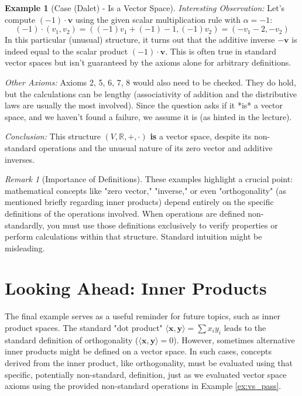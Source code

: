 \documentclass[11pt]{article}
\theoremstyle{definition}
\newtheorem{example}[theorem]{Example}
\theoremstyle{remark}
\newtheorem{remark}[theorem]{Remark}
\newcommand{\field}[1]{\mathbb{#1}} %
\newcommand{\R}{\field{R}}
\newcommand{\veca}[1]{\mathbf{#1}} %
\begin{document}
\begin{example}[Case (Dalet) - Is a Vector Space]
\textit{Interesting Observation:} Let's compute $(-1) \cdot \veca{v}$ using the given scalar multiplication rule with $\alpha = -1$:
\[ (-1) \cdot (v_1, v_2) = ((-1)v_1 + (-1) - 1, (-1)v_2) = (-v_1 - 2, -v_2) \]
In this particular (unusual) structure, it turns out that the additive inverse $-\veca{v}$ is indeed equal to the scalar product $(-1) \cdot \veca{v}$. This is often true in standard vector spaces but isn't guaranteed by the axioms alone for arbitrary definitions.

\textit{Other Axioms:} Axioms 2, 5, 6, 7, 8 would also need to be checked. They do hold, but the calculations can be lengthy (associativity of addition and the distributive laws are usually the most involved). Since the question asks if it *is* a vector space, and we haven't found a failure, we assume it is (as hinted in the lecture).

\textit{Conclusion:} This structure $(V, \R, +, \cdot)$ \textbf{is} a vector space, despite its non-standard operations and the unusual nature of its zero vector and additive inverses.
\end{example}

\begin{remark}[Importance of Definitions]
These examples highlight a crucial point: mathematical concepts like "zero vector," "inverse," or even "orthogonality" (as mentioned briefly regarding inner products) depend entirely on the specific definitions of the operations involved. When operations are defined non-standardly, you must use those definitions exclusively to verify properties or perform calculations within that structure. Standard intuition might be misleading.
\end{remark}

\section{Looking Ahead: Inner Products}
The final example serves as a useful reminder for future topics, such as inner product spaces. The standard "dot product" $\langle \veca{x}, \veca{y} \rangle = \sum x_i y_i$ leads to the standard definition of orthogonality ($\langle \veca{x}, \veca{y} \rangle = 0$). However, sometimes alternative inner products might be defined on a vector space. In such cases, concepts derived from the inner product, like orthogonality, must be evaluated using that specific, potentially non-standard, definition, just as we evaluated vector space axioms using the provided non-standard operations in Example \ref{ex:vs_pass}.
\end{document}
